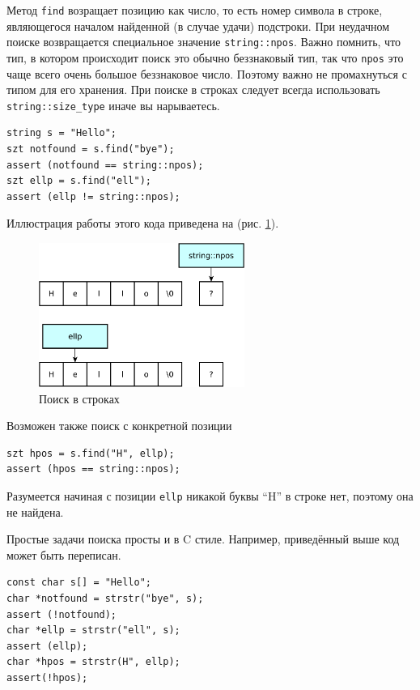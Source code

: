 \documentclass[a4paper,12pt,oneside]{article}
\begin{document}
Метод \lstinline!find! возращает позицию как число, то есть номер символа в строке, являющегося началом найденной (в случае удачи) подстроки. При неудачном поиске возвращается специальное значение \lstinline!string::npos!. Важно помнить, что тип, в котором происходит поиск это обычно беззнаковый тип, так что \lstinline!npos! это чаще всего очень большое беззнаковое число. Поэтому важно не промахнуться с типом для его хранения. При поиске в строках следует всегда использовать \lstinline!string::size_type! иначе вы нарываетесь.

\begin{lstlisting}
string s = "Hello"; 
szt notfound = s.find("bye"); 
assert (notfound == string::npos); 
szt ellp = s.find("ell"); 
assert (ellp != string::npos); 
\end{lstlisting}

Иллюстрация работы этого кода приведена на (рис. \ref{fig:string-find}). 

\begin{figure}[ht]
\centering
\includegraphics[width=0.6\textwidth]{illustrations/string-find-crop.pdf}
\caption{Поиск в строках}
\label{fig:string-find}
\end{figure}

Возможен также поиск с конкретной позиции

\begin{lstlisting}
szt hpos = s.find("H", ellp); 
assert (hpos == string::npos);
\end{lstlisting}

Разумеется начиная с позиции \lstinline!ellp! никакой буквы ``H'' в строке нет, поэтому она не найдена.

Простые задачи поиска просты и в C стиле. Например, приведённый выше код может быть переписан.

\begin{lstlisting}
const char s[] = "Hello";
char *notfound = strstr("bye", s);
assert (!notfound);
char *ellp = strstr("ell", s);
assert (ellp);
char *hpos = strstr(H", ellp);
assert(!hpos); 
\end{lstlisting}
\end{document}

